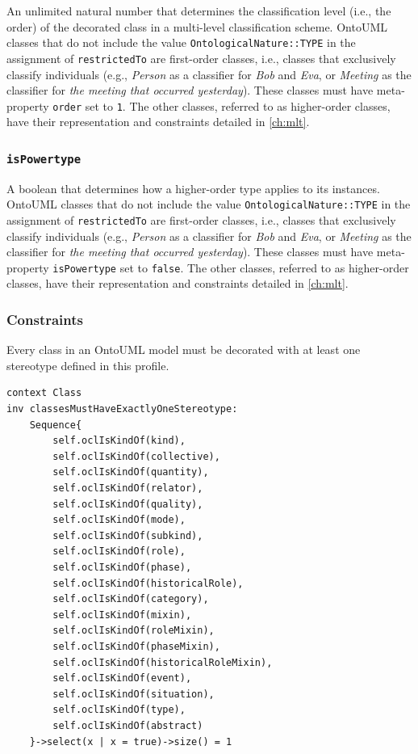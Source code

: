 An unlimited natural number that determines the classification level (i.e., the order) of the decorated class in a multi-level classification scheme. OntoUML classes that do not include the value \texttt{OntologicalNature::TYPE} in the assignment of \texttt{restrictedTo} are first-order classes, i.e., classes that exclusively classify individuals (e.g., \textit{Person} as a classifier for \textit{Bob} and \textit{Eva}, or \textit{Meeting} as the classifier for \textit{the meeting that occurred yesterday}). These classes must have meta-property \texttt{order} set to \texttt{1}. The other classes, referred to as higher-order classes, have their representation and constraints detailed in \autoref{ch:mlt}.
    
\subsubsection{\texttt{isPowertype}}

A boolean that determines how a higher-order type applies to its instances. OntoUML classes that do not include the value \texttt{OntologicalNature::TYPE} in the assignment of \texttt{restrictedTo} are first-order classes, i.e., classes that exclusively classify individuals (e.g., \textit{Person} as a classifier for \textit{Bob} and \textit{Eva}, or \textit{Meeting} as the classifier for \textit{the meeting that occurred yesterday}). These classes must have meta-property \texttt{isPowertype} set to \texttt{false}. The other classes, referred to as higher-order classes, have their representation and constraints detailed in \autoref{ch:mlt}.

\subsubsection{Constraints}

\begin{constraint}
\label{constraint:classesMustHaveExactlyOneStereotype}
Every class in an OntoUML model must be decorated with at least one stereotype defined in this profile.

\begin{lstlisting}[language=OCL]
context Class
inv classesMustHaveExactlyOneStereotype:
    Sequence{
        self.oclIsKindOf(kind),
        self.oclIsKindOf(collective),
        self.oclIsKindOf(quantity),
        self.oclIsKindOf(relator),
        self.oclIsKindOf(quality),
        self.oclIsKindOf(mode),
        self.oclIsKindOf(subkind),
        self.oclIsKindOf(role),
        self.oclIsKindOf(phase),
        self.oclIsKindOf(historicalRole),
        self.oclIsKindOf(category),
        self.oclIsKindOf(mixin),
        self.oclIsKindOf(roleMixin),
        self.oclIsKindOf(phaseMixin),
        self.oclIsKindOf(historicalRoleMixin),
        self.oclIsKindOf(event),
        self.oclIsKindOf(situation),
        self.oclIsKindOf(type),
        self.oclIsKindOf(abstract)
    }->select(x | x = true)->size() = 1
\end{lstlisting}
\end{constraint}

